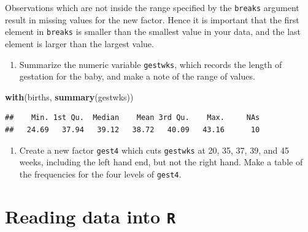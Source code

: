 \documentclass[
]{book}
\newenvironment{Shaded}{\begin{snugshade}}{\end{snugshade}}
\newcommand{\AttributeTok}[1]{\textcolor[rgb]{0.13,0.29,0.53}{#1}}
\newcommand{\DecValTok}[1]{\textcolor[rgb]{0.00,0.00,0.81}{#1}}
\newcommand{\FunctionTok}[1]{\textcolor[rgb]{0.13,0.29,0.53}{\textbf{#1}}}
\newcommand{\NormalTok}[1]{#1}
\newcommand{\OtherTok}[1]{\textcolor[rgb]{0.56,0.35,0.01}{#1}}
\newcommand{\SpecialCharTok}[1]{\textcolor[rgb]{0.81,0.36,0.00}{\textbf{#1}}}
\providecommand{\tightlist}{%
  \setlength{\itemsep}{0pt}\setlength{\parskip}{0pt}}
\theoremstyle{definition}
\theoremstyle{definition}
\theoremstyle{definition}
\theoremstyle{definition}
\theoremstyle{remark}
\begin{document}
Observations which are not inside the range specified by the \texttt{breaks}
argument result in missing values for the new factor. Hence it
is important that the first element in \texttt{breaks} is smaller than the
smallest value in your data, and the last element is larger than the
largest value.

\begin{enumerate}
\def\labelenumi{\arabic{enumi}.}
\tightlist
\item
  Summarize the numeric variable \texttt{gestwks}, which records the
  length of gestation for the baby, and make a note of the range of
  values.
\end{enumerate}

\begin{Shaded}
\begin{Highlighting}[]
\FunctionTok{with}\NormalTok{(births, }\FunctionTok{summary}\NormalTok{(gestwks))}
\end{Highlighting}
\end{Shaded}

\begin{verbatim}
##    Min. 1st Qu.  Median    Mean 3rd Qu.    Max.     NAs 
##   24.69   37.94   39.12   38.72   40.09   43.16      10
\end{verbatim}

\begin{enumerate}
\def\labelenumi{\arabic{enumi}.}
\setcounter{enumi}{1}
\tightlist
\item
  Create a new factor \texttt{gest4} which cuts \texttt{gestwks} at 20,
  35, 37, 39, and 45 weeks, including the left hand end, but not the
  right hand. Make a table of the frequencies for the four levels of \texttt{gest4}.
\end{enumerate}

\begin{Shaded}
\end{Shaded}

\chapter{\texorpdfstring{Reading data into \texttt{R}}{Reading data into R}}\label{reading-data-into-r}
\end{document}

